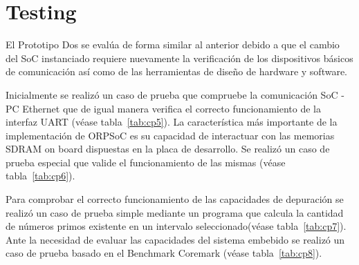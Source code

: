 		\section{Testing}
		
		El Prototipo Dos se evalúa de forma similar al anterior debido a que el cambio del SoC instanciado requiere nuevamente la verificación de los
		dispositivos básicos de comunicación así como de las herramientas de diseño de hardware y software.
		
		Inicialmente se realizó un caso de prueba que compruebe la comunicación SoC - PC  Ethernet que de igual manera verifica el correcto funcionamiento
		de la interfaz UART (véase tabla~\ref{tab:cp5}). La característica más importante de la implementación de ORPSoC es su capacidad de interactuar con las memorias SDRAM on board
		dispuestas en la placa de desarrollo. Se realizó un caso de prueba especial que valide el funcionamiento de las mismas (véase tabla~\ref{tab:cp6}).

		Para comprobar el correcto funcionamiento de las capacidades de depuración se realizó un caso de prueba simple mediante un programa que calcula la
		cantidad de números primos existente en un intervalo seleccionado(véase tabla~\ref{tab:cp7}). Ante la necesidad de evaluar las capacidades del sistema embebido se realizó un caso de prueba basado en el Benchmark Coremark (véase tabla~\ref{tab:cp8}).

